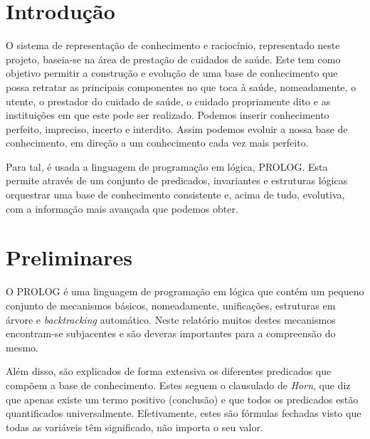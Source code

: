 \documentclass[a4paper]{article}
\begin{document}
\newpage

\tableofcontents

\newpage

\section{Introdução}

\hspace{3mm} O sistema de representação de conhecimento e raciocínio, representado neste projeto, baseia-se na área de prestação de cuidados de saúde. Este tem como objetivo permitir a construção e evolução de uma base de conhecimento que possa retratar as principais componentes no que toca à saúde, nomeadamente, o utente, o prestador do cuidado de saúde, o cuidado propriamente dito e as instituições em que este pode ser realizado. Podemos inserir conhecimento perfeito, impreciso, incerto e interdito. Assim podemos evoluir a nossa base de conhecimento, em direção a um conhecimento cada vez mais perfeito.

Para tal, é usada a linguagem de programação em lógica, PROLOG. Esta permite através de um conjunto de predicados, invariantes e estruturas lógicas orquestrar uma base de conhecimento consistente e, acima de tudo, evolutiva, com a informação mais avançada que podemos obter.

\section{Preliminares}

\hspace{3mm} O PROLOG é uma linguagem de programação em lógica que contém um pequeno conjunto de mecanismos básicos, nomeadamente, unificações, estruturas em árvore e \textit{backtracking} automático. Neste relatório muitos destes mecanismos encontram-se subjacentes e são deveras importantes para a compreensão do mesmo. \cite{Bratko:1990:PPA:533072}

Além disso, são explicados de forma extensiva os diferentes predicados que compõem a base de conhecimento. Estes seguem o clausulado de \textit{Horn}, que diz que apenas existe um termo positivo (conclusão) e que todos os predicados estão quantificados universalmente. Efetivamente, estes são fórmulas fechadas visto que todas as variáveis têm significado, não importa o seu valor.
\end{document}
